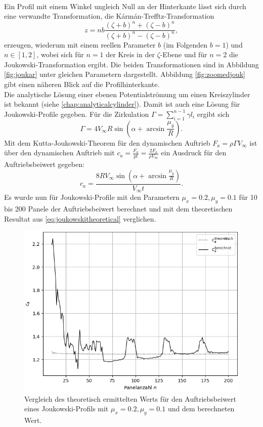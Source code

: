 \\
Ein Profil mit einem Winkel ungleich Null an der Hinterkante lässt sich durch eine verwandte Transformation, die Kármán-Trefftz-Transformation
\begin{equation}
z=nb{\frac {(\zeta +b)^{n}+(\zeta -b)^{n}}{(\zeta +b)^{n}-(\zeta -b)^{n}}},
\end{equation}
erzeugen, wiederum mit einem reellen Parameter $b$ (im Folgenden $b=1$) und $n \in [1,2]$, wobei sich für $n=1$ der Kreis in der $\zeta$-Ebene und für $n=2$ die Joukowski-Transformation ergibt. Die beiden Transformationen sind in Abbildung \ref{fig:joukar} unter gleichen Parametern dargestellt. Abbildung \ref{fig:zoomedjouk} gibt einen näheren Blick auf die Profilhinterkante. \\
Die analytische Lösung einer ebenen Potentialströmung um einen Kreiszylinder ist bekannt (siehe \ref{chap:analyticalcylinder}). Damit ist auch eine Lösung für Joukowski-Profile gegeben. Für die Zirkulation $\Gamma = \sum_{i=1}^{n-1} \gamma l_i$ ergibt sich
\begin{equation}
\Gamma = 4  V_{\infty}R \sin{\left(\alpha + \arcsin \frac{\mu_y}{R} \right)}.
\end{equation}
Mit dem Kutta-Joukowski-Theorem für den dynamischen Auftrieb $F_a = \rho \Gamma V_{\infty}$ ist über den dynamischen Auftrieb mit $c_a = \tfrac{F_a}{pt} = \tfrac{2F_a}{\rho V_{\infty}}$ ein Ausdruck für den Auftriebsbeiwert gegeben:
\begin{equation}
\label{eq:joukowskitheoretical}
c_a = \frac{8  R V_{\infty} \sin{\left(\alpha + \arcsin \frac{\mu_y}{R} \right)}}{V_{\infty}t}.
\end{equation} 
Es wurde nun für Joukowski-Profile mit den Parametern $\mu_x = 0.2, \mu_y =0.1$ für 10 bis 200 Panele der Auftriebsbeiwert berechnet und mit dem theoretischen Resultat aus \eqref{eq:joukowskitheoretical} verglichen. 
\begin{figure}[!ht]
\begin{center} \includegraphics[scale=0.5]{figures/joukowskierror.png} \end{center}
\caption{Vergleich des theoretisch ermittelten Werts für den Auftriebsbeiwert eines Joukowski-Profils mit $\mu_x = 0.2, \mu_y =0.1$ und dem berechneten Wert.}
\label{fig:joukowskitheoretical}
\end{figure}
